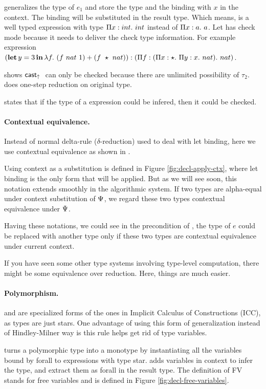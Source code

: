  generalizes the type of $e_1$ and store the type and the binding with $x$ in the context. The binding will be substituted in the result type. Which means,  is a well typed expression with type $\Pi x:int.~ {int}$ instead of $\Pi x:a.~ a $. Let has check mode because it needs to deliver the check type information. For example expression $(\operatorname{\mathbf{let}} y = 3 \operatorname{\mathbf{in}} \lambda {f}.~ {(f~nat~1) + (f~\star~nat))}: (\Pi f:(\Pi x:\star.~ {\Pi y:x.~ nat}).~ nat)$.


 shows $\mathsf{cast}_\uparrow~$ can only be checked because there are unlimited possibility of $\tau_2$.  does one-step reduction on original type.

 states that if the type of a expression could be infered, then it could be checked.

\paragraph{Contextual equivalence.} Instead of normal delta-rule ($\delta$-reduction) used to deal with let binding, here we use contextual equivalence as shown in .

Using context as a substitution is defined in Figure \ref{fig:decl-apply-ctx}, where let binding is the only form that will be applied. But as we will see soon, this notation extends smoothly in the algorithmic system. If two types are alpha-equal under context substitution of $\Psi$, we regard these two types contextual equivalence under $\Psi$.

Having these notations, we could see in the precondition of , the type of $e$ could be replaced with another type only if these two types are contextual equivalence under current context.

If you have seen some other type systems involving type-level computation, there might be some equivalence over reduction. Here, things are much easier.

\paragraph{Polymorphism.}  and  are specialized forms of the ones in Implicit Calculus of Constructions (ICC), as types are just stars. One advantage of using this form of generalization instead of Hindley-Milner way is this rule helps get rid of type variables.

 turns a polymorphic type into a monotype by instantiating all the variables bound by forall to expressions with type star.  adds variables in context to infer the type, and extract them as forall in the result type. The definition of FV stands for free variables and is defined in Figure \ref{fig:decl-free-variables}.
